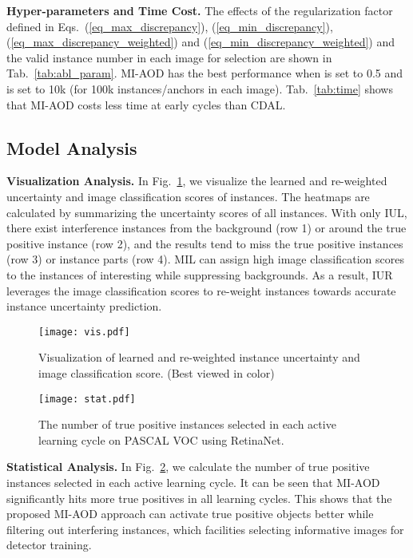 \documentclass[final]{cvpr}
\begin{document}
\textbf{Hyper-parameters and Time Cost.} The effects of the regularization factor  defined in Eqs.~(\ref{eq_max_discrepancy}), (\ref{eq_min_discrepancy}), (\ref{eq_max_discrepancy_weighted}) and (\ref{eq_min_discrepancy_weighted}) and the valid instance number  in each image for selection are shown in Tab.~\ref{tab:abl_param}. MI-AOD has the best performance when  is set to 0.5 and  is set to 10k (for 100k instances/anchors in each image).
Tab.~\ref{tab:time} shows that MI-AOD costs less time at early cycles than CDAL.

\subsection{Model Analysis}
\textbf{Visualization Analysis.} In Fig.~\ref{fig:vis}, we visualize the learned and re-weighted uncertainty and image classification scores of instances. The heatmaps are calculated by summarizing the uncertainty scores of all instances. With only IUL, there exist interference instances from the background (row 1) or around the true positive instance (row 2), and the results tend to miss the true positive instances (row 3) or instance parts (row 4).
MIL can assign high image classification scores to the instances of interesting while suppressing backgrounds. As a result, IUR leverages the image classification scores to re-weight instances towards accurate instance uncertainty prediction.

\begin{figure}[t]
    \centering
    \texttt{[image: vis.pdf]}
    \caption{Visualization of learned and re-weighted instance uncertainty and image classification score. (Best viewed in color)
    }
    \label{fig:vis}
\end{figure}

\begin{figure}[t]
    \centering
    \texttt{[image: stat.pdf]}
    \caption{The number of true positive instances selected in each active learning cycle on PASCAL VOC using RetinaNet.}
    \label{fig:stat}
\end{figure}

\textbf{Statistical Analysis.} In Fig.~\ref{fig:stat}, we calculate the number of true positive instances selected in each active learning cycle. It can be seen that MI-AOD significantly hits more true positives in all learning cycles. This shows that the proposed MI-AOD approach can activate true positive objects better while filtering out interfering instances, which facilities selecting informative images for detector training.
\end{document}
